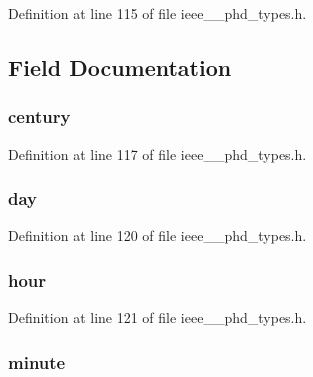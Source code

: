 Definition at line 115 of file ieee\+\_\+\_\+phd\+\_\+types.\+h.



\subsection{Field Documentation}
\hypertarget{struct___absolute_time_afce645bc92dadedc5b151101f0781730}{}
\subsubsection[{century}]{ century}\label{struct___absolute_time_afce645bc92dadedc5b151101f0781730}


Definition at line 117 of file ieee\+\_\+\_\+phd\+\_\+types.\+h.

\hypertarget{struct___absolute_time_a138c3453b4e070c4b7fe82716853a657}{}
\subsubsection[{day}]{ day}\label{struct___absolute_time_a138c3453b4e070c4b7fe82716853a657}


Definition at line 120 of file ieee\+\_\+\_\+phd\+\_\+types.\+h.

\hypertarget{struct___absolute_time_ac646da02ad7b45eeffe4b9297bf359ad}{}
\subsubsection[{hour}]{ hour}\label{struct___absolute_time_ac646da02ad7b45eeffe4b9297bf359ad}


Definition at line 121 of file ieee\+\_\+\_\+phd\+\_\+types.\+h.

\hypertarget{struct___absolute_time_a58daa693afe48aa27fae8d0abb7b857a}{}
\subsubsection[{minute}]{ minute}\label{struct___absolute_time_a58daa693afe48aa27fae8d0abb7b857a}


